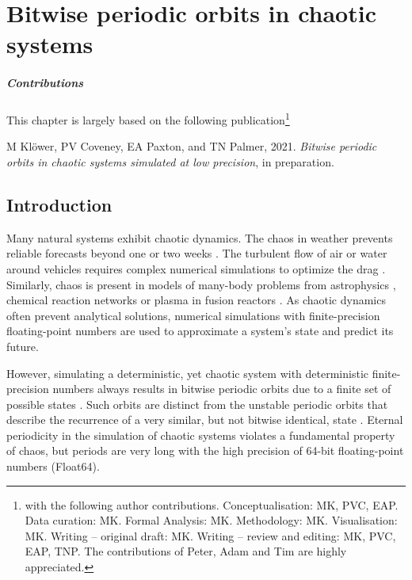 \chapter{Bitwise periodic orbits in chaotic systems}
\label{chap:orbits}

\small \paragraph{Contributions} This chapter is largely based on the following publication\footnote{with the following author contributions.
Conceptualisation: MK, PVC, EAP. Data curation: MK. Formal Analysis: MK. Methodology: MK. Visualisation: MK. Writing – original draft:
MK. Writing – review and editing: MK, PVC, EAP, TNP. The contributions of Peter, Adam and Tim are highly appreciated.}

\vspace{\baselineskip}
\indent M Klöwer, PV Coveney, EA Paxton, and TN Palmer, 2021.
\emph{Bitwise periodic orbits in chaotic systems simulated at low precision}, in preparation.
\vspace{\baselineskip}
\normalsize

\section{Introduction}

Many natural systems exhibit chaotic dynamics. The chaos in weather prevents reliable forecasts beyond
one or two weeks \citep{Bauer2015,Palmer2019}. The turbulent flow of air or water around vehicles requires
complex numerical simulations to optimize the drag \citep{Cummings2015,Moran2003}. Similarly, chaos is present
in models of many-body problems from astrophysics \citep{Cornish2001,Springel2005}, chemical reaction networks
\citep{Coveney2016} or plasma in fusion reactors
\citep{DIppolito2011,Ricci2012,ITERPhysicsExpertGrouponConfinementandTransport1999}. As chaotic dynamics often
prevent analytical solutions, numerical simulations with finite-precision floating-point numbers \citep{IEEE1985}
are used to approximate a system’s state and predict its future.

However, simulating a deterministic, yet chaotic system with deterministic finite-precision numbers always results in
bitwise periodic orbits due to a finite set of possible states \citep{Boghosian2019}. Such orbits are distinct from the
unstable periodic orbits that describe the recurrence of a very similar, but not bitwise identical, state \citep{Cvitanovic2013}.
Eternal periodicity in the simulation of chaotic systems violates a fundamental property of chaos, but periods are very
long with the high precision of 64-bit floating-point numbers (Float64).

